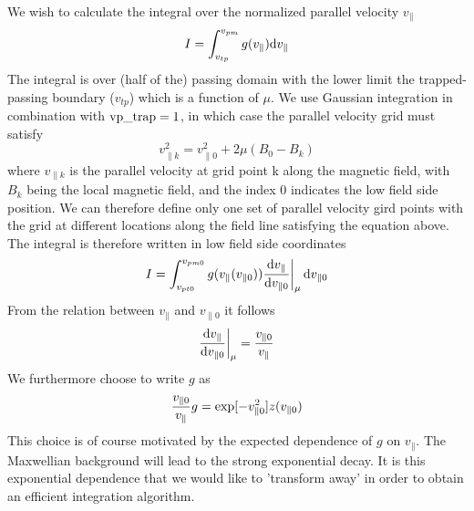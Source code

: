 We wish to calculate the integral over the normalized parallel velocity $v_\parallel$ 
\begin{equation}
I = \int\nolimits_{v_{tp}}^{v_{pm}} g(v_\parallel) {\rm d} v_\parallel 
\end{equation} 
The integral is over (half of the) passing domain with the lower limit the trapped-passing 
boundary ($v_{tp}$) which is a function of $\mu$. We use Gaussian integration 
in combination with ${\rm vp\_trap = 1}$, in which case the parallel velocity grid must 
satisfy 
\begin{equation} 
v_{\parallel k}^2 = v_{\parallel 0}^2 + 2 \mu (B_0 - B_k) 
\end{equation} 
where $v_{\parallel k}$ is the parallel velocity at grid point k along the magnetic field, 
with $B_k$ being the local magnetic field, and the index 0 indicates the low field 
side position. We can therefore define only one set of parallel velocity gird points 
with the grid at different locations along the field line satisfying the equation 
above. The integral is therefore written in low field side coordinates 
\begin{equation} 
I = \int\nolimits_{v_{pt0}}^{v_{pm0}} g(v_\parallel ( v_{\parallel 0}) ) {{\rm d} v_\parallel \over 
{\rm d} v_{\parallel 0}} \biggr \vert_\mu \, {\rm d} v_{\parallel 0} 
\end{equation} 
From the relation between $v_\parallel$ and $v_{\parallel 0}$ it follows 
\begin{equation} 
{{\rm d} v_\parallel \over {\rm d} v_{\parallel 0}} \biggr \vert_\mu  = {v_{\parallel 0} \over 
v_\parallel } 
\end{equation}
We furthermore choose to write $g$ as 
\begin{equation}
{v_{\parallel 0} \over v_\parallel} g = \exp [-v_{\parallel 0}^2 ] z(v_{\parallel 0} )
\label{zdef} 
\end{equation} 
This choice is of course motivated by the expected dependence of $g$ on $v_\parallel$. The 
Maxwellian background will lead to the strong exponential decay. It is this exponential 
dependence that we would like to 'transform away' in order to obtain an efficient integration
algorithm. 

